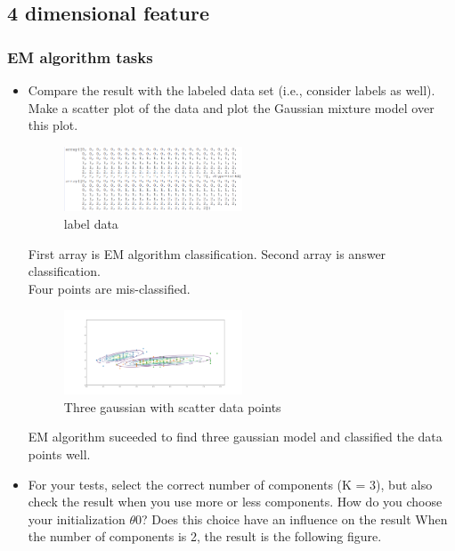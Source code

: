 \documentclass[a4paper]{article}
\begin{document}
	\subsection{4 dimensional feature}
	\subsubsection{EM algorithm tasks}
	\begin{itemize}
		\item Compare the result with the labeled data set (i.e., consider labels as well). Make a scatter plot of the data and plot the Gaussian mixture model over this plot.

		\begin{figure}[h]
			\begin{center}
				\includegraphics[width=0.5\textwidth]{4_number_diff.png}
				\caption{label data}
			\end{center}
		\end{figure}
		First array is EM algorithm classification. Second array is answer classification.\\
		Four points are mis-classified.

		\begin{figure}[h]
			\begin{center}
				\includegraphics[width=0.5\textwidth]{4_gauss.png}
				\caption{Three gaussian with scatter data points}
			\end{center}
		\end{figure}

		EM algorithm suceeded to find three gaussian model and classified the data points well.
		\clearpage
		\item For your tests, select the correct number of components (K = 3), but also check the result when you use more or less components. How do you choose your initialization $\theta$0? Does this choice have an inﬂuence on the result
		When the number of components is 2, the result is the following figure.


\end{itemize}
\end{document}
